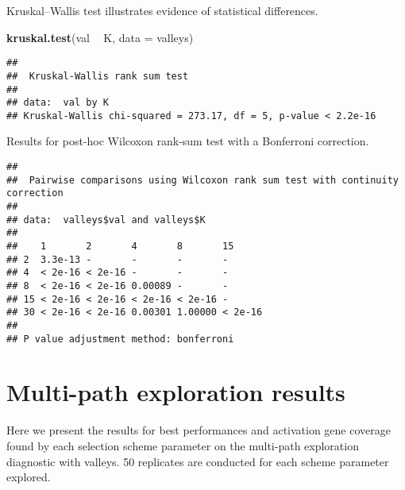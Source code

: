 \documentclass[]{book}
\newenvironment{Shaded}{\begin{snugshade}}{\end{snugshade}}
\newcommand{\DataTypeTok}[1]{\textcolor[rgb]{0.13,0.29,0.53}{#1}}
\newcommand{\KeywordTok}[1]{\textcolor[rgb]{0.13,0.29,0.53}{\textbf{#1}}}
\newcommand{\NormalTok}[1]{#1}
\newcommand{\OperatorTok}[1]{\textcolor[rgb]{0.81,0.36,0.00}{\textbf{#1}}}
\newcommand{\OtherTok}[1]{\textcolor[rgb]{0.56,0.35,0.01}{#1}}
\newcommand{\StringTok}[1]{\textcolor[rgb]{0.31,0.60,0.02}{#1}}
\begin{document}
Kruskal--Wallis test illustrates evidence of statistical differences.

\begin{Shaded}
\begin{Highlighting}[]
\KeywordTok{kruskal.test}\NormalTok{(val }\OperatorTok{~}\StringTok{ }\NormalTok{K, }\DataTypeTok{data =}\NormalTok{ valleys)}
\end{Highlighting}
\end{Shaded}

\begin{verbatim}
## 
##  Kruskal-Wallis rank sum test
## 
## data:  val by K
## Kruskal-Wallis chi-squared = 273.17, df = 5, p-value < 2.2e-16
\end{verbatim}

Results for post-hoc Wilcoxon rank-sum test with a Bonferroni correction.

\begin{Shaded}
\end{Shaded}

\begin{verbatim}
## 
##  Pairwise comparisons using Wilcoxon rank sum test with continuity correction 
## 
## data:  valleys$val and valleys$K 
## 
##    1       2       4       8       15     
## 2  3.3e-13 -       -       -       -      
## 4  < 2e-16 < 2e-16 -       -       -      
## 8  < 2e-16 < 2e-16 0.00089 -       -      
## 15 < 2e-16 < 2e-16 < 2e-16 < 2e-16 -      
## 30 < 2e-16 < 2e-16 0.00301 1.00000 < 2e-16
## 
## P value adjustment method: bonferroni
\end{verbatim}

\hypertarget{multi-path-exploration-results-5}{%
\section{Multi-path exploration results}\label{multi-path-exploration-results-5}}

Here we present the results for best performances and activation gene coverage found by each selection scheme parameter on the multi-path exploration diagnostic with valleys.
50 replicates are conducted for each scheme parameter explored.
\end{document}
